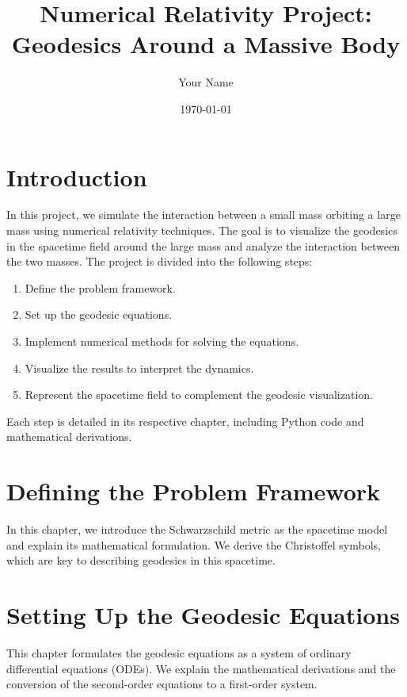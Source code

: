 \documentclass[12pt]{article}
\title{Numerical Relativity Project: Geodesics Around a Massive Body}
\author{Your Name}
\date{\today}
\begin{document}
\maketitle

\tableofcontents

\section*{Introduction}

In this project, we simulate the interaction between a small mass orbiting a large mass using numerical relativity techniques. The goal is to visualize the geodesics in the spacetime field around the large mass and analyze the interaction between the two masses. The project is divided into the following steps:
\begin{enumerate}
    \item Define the problem framework.
    \item Set up the geodesic equations.
    \item Implement numerical methods for solving the equations.
    \item Visualize the results to interpret the dynamics.
    \item Represent the spacetime field to complement the geodesic visualization.
\end{enumerate}

Each step is detailed in its respective chapter, including Python code and mathematical derivations.

\newpage

\section{Defining the Problem Framework}
In this chapter, we introduce the Schwarzschild metric as the spacetime model and explain its mathematical formulation. We derive the Christoffel symbols, which are key to describing geodesics in this spacetime.

\newpage

\section{Setting Up the Geodesic Equations}
This chapter formulates the geodesic equations as a system of ordinary differential equations (ODEs). We explain the mathematical derivations and the conversion of the second-order equations to a first-order system.
\end{document}
